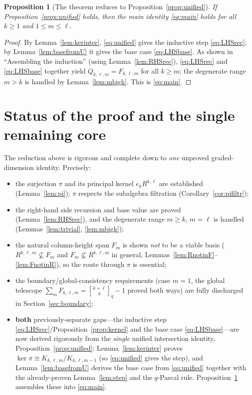 \documentclass{amsart}
\newtheorem{proposition}{Proposition}
\theoremstyle{definition}
\newcommand{\qbin}[2]{\genfrac{[}{]}{0pt}{}{#1}{#2}_q}
\newcommand{\rkl}{R^{k,\ell}}
\newcommand{\Rklm}{R^{k,\ell,m}}
\begin{document}
\begin{proposition}[The theorem reduces to Proposition~\ref{prop:unified}]
\label{prop:reduceall}
If Proposition~\ref{prop:unified} holds, then the main identity \eqref{eq:main} holds
for all $k\ge1$ and $1\le m\le\ell$.
\end{proposition}

\begin{proof}
By Lemma~\ref{lem:kerinter}, \eqref{eq:unified} gives the inductive step
\eqref{eq:LHSrec}; by Lemma~\ref{lem:basefromU} it gives the base case
\eqref{eq:LHSbase}. As shown in ``Assembling the induction'' (using
Lemma~\ref{lem:RHSrec}), \eqref{eq:LHSrec} and \eqref{eq:LHSbase} together yield
$Q_{k,\ell,m}=F_{k,\ell,m}$ for all $k\ge m$; the degenerate range $m>k$ is handled by
Lemma~\ref{lem:mbigk}. This is \eqref{eq:main}.
\end{proof}


\section*{Status of the proof and the single remaining core}

The reduction above is rigorous and complete down to \emph{one} unproved
graded-dimension identity. Precisely:

\begin{itemize}
\item the surjection $\pi$ and its principal kernel $e_k\rkl$ are established
(Lemma~\ref{lem:pi}); $\pi$ respects the subalgebra filtration
(Corollary~\ref{cor:pifiltr});
\item the right-hand side recursion and base value are proved (Lemma~\ref{lem:RHSrec}),
and the degenerate range $m\ge k$, $m=\ell$ is handled (Lemmas~\ref{lem:trivial},
\ref{lem:mbigk});
\item the natural column-height span $F_m$ is shown \emph{not} to be a viable basis
($\Rklm\not\subseteq F_m$ and $F_m\not\subseteq\Rklm$ in general,
Lemmas~\ref{lem:RnotinF}--\ref{lem:FnotinR}), so the route through $\pi$ is essential;
\item the boundary/global-consistency requirements (case $m=1$, the global telescope
$\sum_m F_{k,\ell,m}=\qbin{k+\ell}{k}-1$ proved both ways) are fully discharged in
Section~\ref{sec:boundary};
\item \textbf{both} previously-separate gaps---the inductive step
\eqref{eq:LHSrec}/Proposition~\ref{prop:kernel} and the base case
\eqref{eq:LHSbase}---are now derived rigorously from the \emph{single} unified
intersection identity, Proposition~\ref{prop:unified}: Lemma~\ref{lem:kerinter}
proves $\ker\overline\pi\cong K_{k,\ell,m}/K_{k,\ell,m-1}$ (so \eqref{eq:unified}
gives the step), and Lemma~\ref{lem:basefromU} derives the base case from
\eqref{eq:unified} together with the already-proven Lemma~\ref{lem:step} and the
$q$-Pascal rule. Proposition~\ref{prop:reduceall} assembles these into
\eqref{eq:main}.
\end{itemize}
\end{document}
